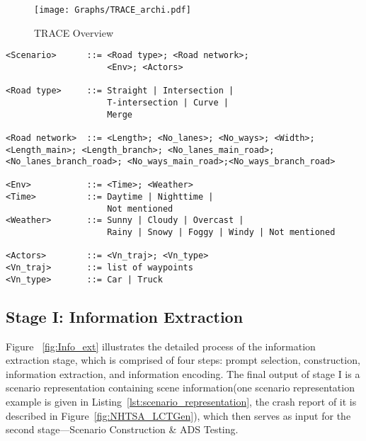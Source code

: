 
\begin{figure}[!t]
  \centering
  \texttt{[image: Graphs/TRACE\_archi.pdf]}
  \caption{TRACE Overview}
  \label{fig:TRACE}
\end{figure}


\begin{lstlisting}[caption=The Structure of Scenario DSL, label={lst:DSL-example}]
<Scenario>      ::= <Road type>; <Road network>; 
                    <Env>; <Actors>

<Road type>     ::= Straight | Intersection | 
                    T-intersection | Curve | 
                    Merge

<Road network>  ::= <Length>; <No_lanes>; <No_ways>; <Width>; <Length_main>; <Length_branch>; <No_lanes_main_road>;<No_lanes_branch_road>; <No_ways_main_road>;<No_ways_branch_road>

<Env>           ::= <Time>; <Weather>
<Time>          ::= Daytime | Nighttime | 
                    Not mentioned
<Weather>       ::= Sunny | Cloudy | Overcast | 
                    Rainy | Snowy | Foggy | Windy | Not mentioned

<Actors>        ::= <Vn_traj>; <Vn_type>
<Vn_traj>       ::= list of waypoints
<Vn_type>       ::= Car | Truck
\end{lstlisting}


\subsection{Stage I: Information Extraction}
Figure ~\ref{fig:Info_ext} illustrates the detailed process of the information extraction stage, which is comprised of four steps: prompt selection, {\tooltwo} construction, information extraction, and information encoding. The final output of stage I is a scenario representation containing scene information(one scenario representation example is given in Listing~\ref{lst:scenario_representation}, the crash report of it is described in Figure~\ref{fig:NHTSA_LCTGen}), which then serves as input for the second stage—Scenario Construction \& ADS Testing.

